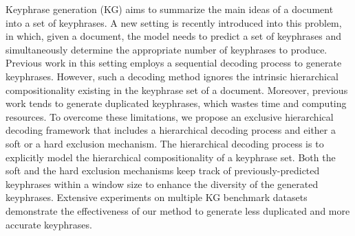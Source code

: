 Keyphrase generation (KG) aims to summarize the main ideas of a document into a set of keyphrases. A new setting is recently introduced into this problem, in which, given a document, the model needs to predict a set of keyphrases and simultaneously determine the appropriate number of keyphrases to produce. Previous work in this setting employs a sequential decoding process to generate keyphrases. However, such a decoding method ignores the intrinsic hierarchical compositionality existing in the keyphrase set of a document. Moreover, previous work tends to generate duplicated keyphrases, which wastes time and computing resources. To overcome these limitations, we propose an exclusive hierarchical decoding framework that includes a hierarchical decoding process and either a soft or a hard exclusion mechanism. The hierarchical decoding process is to explicitly model the hierarchical compositionality of a keyphrase set. Both the soft and the hard exclusion mechanisms keep track of previously-predicted keyphrases within a window size to enhance the diversity of the generated keyphrases. Extensive experiments on multiple KG benchmark datasets demonstrate the effectiveness of our method to generate less duplicated and more accurate keyphrases.
